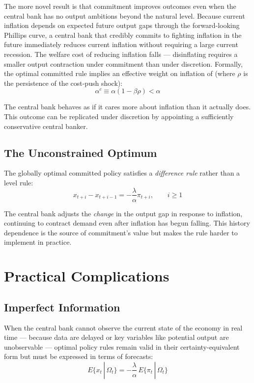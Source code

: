 \documentclass[11pt, a4paper]{article}
\begin{document}
The more novel result is that commitment improves outcomes even when the
central bank has no output ambitions beyond the natural level. Because
current inflation depends on expected future output gaps through the
forward-looking Phillips curve, a central bank that credibly commits to
fighting inflation in the future immediately reduces current inflation without
requiring a large current recession. The welfare cost of reducing inflation
falls --- disinflating requires a smaller output contraction under commitment
than under discretion. Formally, the optimal committed rule implies an
effective weight on inflation of (where $\rho$ is the persistence of the cost-push shock):
\begin{equation}
    \alpha^c \equiv \alpha(1-\beta\rho) < \alpha
\end{equation}

The central bank behaves as if it cares more about inflation than it actually
does. This outcome can be replicated under discretion by appointing a
sufficiently conservative central banker.

\subsection*{The Unconstrained Optimum}

The globally optimal committed policy satisfies a \textit{difference rule}
rather than a level rule:
\begin{equation}
    x_{t+i} - x_{t+i-1} = -\frac{\lambda}{\alpha}\pi_{t+i},
    \qquad i \geq 1
\end{equation}

The central bank adjusts the \textit{change} in the output gap in response
to inflation, continuing to contract demand even after inflation has begun
falling. This history dependence is the source of commitment's value but
makes the rule harder to implement in practice.

\section{Practical Complications}

\subsection*{Imperfect Information}

When the central bank cannot observe the current state of the economy in real
time --- because data are delayed or key variables like potential output are
unobservable --- optimal policy rules remain valid in their
certainty-equivalent form but must be expressed in terms of forecasts:
\begin{equation}
    E\{x_t \,|\, \Omega_t\} = -\frac{\lambda}{\alpha}\,E\{\pi_t \,|\, \Omega_t\}
\end{equation}
\end{document}
